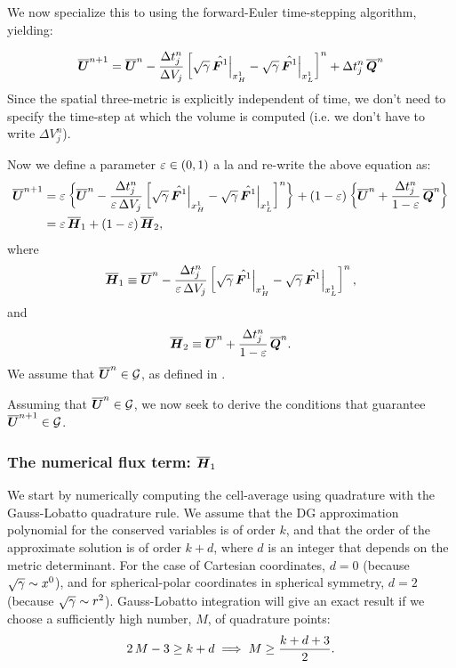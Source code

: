  We now specialize this to using the forward-Euler time-stepping algorithm, yielding:

\begin{equation}
    \overline{\boldsymbol{U}}^{n+1}=\overline{\boldsymbol{U}}^{n}-\frac{\Delta t^{n}_{j}}{\Delta V_{j}}\left[\sqrt{\gamma}\,\hat{\boldsymbol{F}^{1}}\Big|_{x^{1}_{H}}-\sqrt{\gamma}\,\hat{\boldsymbol{F}^{1}}\Big|_{x^{1}_{L}}\right]^{n}+\Delta t^{n}_{j}\,\overline{\boldsymbol{Q}}^{n}
\end{equation}
 Since the spatial three-metric is explicitly independent of time, we don't need to specify the time-step at which the volume is computed (i.e. we don't have to write $\Delta V^{n}_{j}$).

Now we define a parameter $\varepsilon\in\left(0,1\right)$ a la \citet{ZS2011b} and re-write the above equation as:
\begin{align}
    \overline{\boldsymbol{U}}^{n+1}&=\varepsilon\left\{\overline{\boldsymbol{U}}^{n}-\frac{\Delta t^{n}_{j}}{\varepsilon\,\Delta V_{j}}\left[\sqrt{\gamma}\,\hat{\boldsymbol{F}^{1}}\Big|_{x^{1}_{H}}-\sqrt{\gamma}\,\hat{\boldsymbol{F}^{1}}\Big|_{x^{1}_{L}}\right]^{n}\right\}+\left(1-\varepsilon\right)\left\{\overline{\boldsymbol{U}}^{n}+\frac{\Delta t^{n}_{j}}{1-\varepsilon}\,\overline{\boldsymbol{Q}}^{n}\right\}\\
    &=\varepsilon\,\overline{\boldsymbol{H}}_{1}+\left(1-\varepsilon\right)\overline{\boldsymbol{H}}_{2},
\end{align}
where
\begin{equation}\label{Eq:H1}
    \overline{\boldsymbol{H}}_{1}\equiv\overline{\boldsymbol{U}}^{n}-\frac{\Delta t^{n}_{j}}{\varepsilon\,\Delta V_{j}}\left[\sqrt{\gamma}\,\hat{\boldsymbol{F}^{1}}\Big|_{x^{1}_{H}}-\sqrt{\gamma}\,\hat{\boldsymbol{F}^{1}}\Big|_{x^{1}_{L}}\right]^{n},
\end{equation}
and
\begin{equation}
    \overline{\boldsymbol{H}}_{2}\equiv\overline{\boldsymbol{U}}^{n}+\frac{\Delta t^{n}_{j}}{1-\varepsilon}\,\overline{\boldsymbol{Q}}^{n}.
\end{equation}
 We assume that $\overline{\boldsymbol{U}}^{n}\in\mathcal{G}$, as defined in \citet{Mignone2005}.

Assuming that $\overline{\boldsymbol{U}}^{n}\in\mathcal{G}$, we now seek to derive the conditions that guarantee $\overline{\boldsymbol{U}}^{n+1}\in\mathcal{G}$.

\subsubsection{The numerical flux term: $\overline{\boldsymbol{H}}_{1}$}

We start by numerically computing the cell-average using quadrature with the Gauss-Lobatto quadrature rule. We assume that the DG approximation polynomial for the conserved variables is of order $k$, and that the order of the approximate solution is of order $k+d$, where $d$ is an integer that depends on the metric determinant. For the case of Cartesian coordinates, $d=0$ (because $\sqrt{\gamma}\sim x^{0}$), and for spherical-polar coordinates in spherical symmetry, $d=2$ (because $\sqrt{\gamma}\sim r^{2}$). Gauss-Lobatto integration will give an exact result if we choose a sufficiently high number, $M$, of quadrature points:
\begin{equation}
    2\,M-3\geq k+d\implies M\geq\frac{k+d+3}{2}.
\end{equation}

